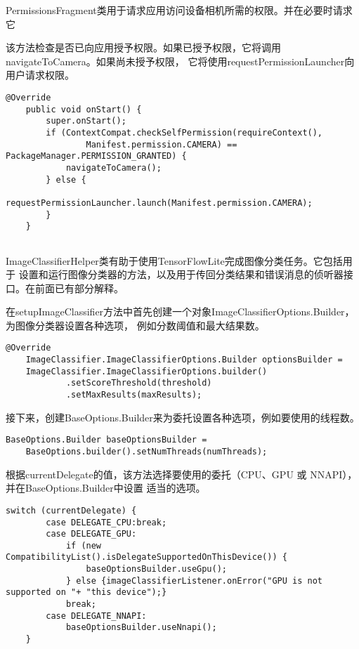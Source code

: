 PermissionsFragment类用于请求应用访问设备相机所需的权限。并在必要时请求它

该方法检查是否已向应用授予权限。如果已授予权限，它将调用navigateToCamera。如果尚未授予权限，
它将使用requestPermissionLauncher向用户请求权限。
\begin{lstlisting}[style=code]
    @Override
    public void onStart() {
        super.onStart();
        if (ContextCompat.checkSelfPermission(requireContext(),
                Manifest.permission.CAMERA) == PackageManager.PERMISSION_GRANTED) {
            navigateToCamera();
        } else {
            requestPermissionLauncher.launch(Manifest.permission.CAMERA);
        }
    }
    
\end{lstlisting}

ImageClassifierHelper类有助于使用TensorFlow\hspace{0.5em}Lite完成图像分类任务。它包括用于
设置和运行图像分类器的方法，以及用于传回分类结果和错误消息的侦听器接口。在前面已有部分解释。

在setupImageClassifier方法中首先创建一个对象ImageClassifierOptions.Builder，为图像分类器设置各种选项，
例如分数阈值和最大结果数。
\begin{lstlisting}[style=code]
    @Override
    ImageClassifier.ImageClassifierOptions.Builder optionsBuilder =
    ImageClassifier.ImageClassifierOptions.builder()
            .setScoreThreshold(threshold)
            .setMaxResults(maxResults);
\end{lstlisting}

接下来，创建BaseOptions.Builder来为委托设置各种选项，例如要使用的线程数。
\begin{lstlisting}[style=code]
    BaseOptions.Builder baseOptionsBuilder =
    BaseOptions.builder().setNumThreads(numThreads);
\end{lstlisting}

根据currentDelegate的值，该方法选择要使用的委托（CPU、GPU 或 NNAPI），并在BaseOptions.Builder中设置
适当的选项。
\begin{lstlisting}[style=code]
    switch (currentDelegate) {
        case DELEGATE_CPU:break;
        case DELEGATE_GPU:
            if (new CompatibilityList().isDelegateSupportedOnThisDevice()) {
                baseOptionsBuilder.useGpu();
            } else {imageClassifierListener.onError("GPU is not supported on "+ "this device");}
            break;
        case DELEGATE_NNAPI:
            baseOptionsBuilder.useNnapi();
    }
\end{lstlisting}

